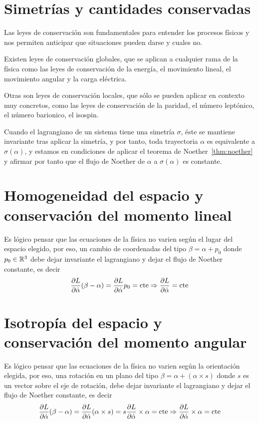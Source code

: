 \section{Simetrías y cantidades conservadas}

Las leyes de conservación son fundamentales para entender los procesos físicos y nos permiten anticipar que situaciones pueden darse y cuales no.

Existen leyes de conservación globales, que se aplican a cualquier rama de la física como las leyes de conservación de la energía, el movimiento lineal, el movimiento angular y la carga eléctrica.

Otras son leyes de conservación locales, que sólo se pueden aplicar en contexto muy concretos, como las leyes de conservación de la paridad, el número leptónico, el número barionico, el isospin.

Cuando el lagrangiano de un sistema tiene una simetría $\sigma$, éste se mantiene invariante tras aplicar la simetría, y por tanto, toda trayectoria $\alpha$ es equivalente a $\sigma(\alpha)$, y estamos en condiciones de aplicar el teorema de Noether~\eqref{thm:noether} y afirmar por tanto que el flujo de Noether de $\alpha$ a $\sigma(\alpha)$ es constante.

\section{Homogeneidad del espacio y conservación del momento lineal}
Es lógico pensar que las ecuaciones de la física no varien según el lugar del espacio elegido, por eso, un cambio de coordenadas del tipo $\beta=\alpha+p_0$ donde $p_0\in\mathbb{R}^3$ debe dejar invariante el lagrangiano y dejar el flujo de Noether constante, es decir
\begin{equation}
	\label{eq:conservacion_momento_lineal}
	\frac{\partial L}{\partial\dot{\alpha}}(\beta-\alpha) = \frac{\partial L}{\partial\dot{\alpha}}p_0=\text{cte}\Rightarrow\frac{\partial L}{\partial\dot{\alpha}}=\text{cte}
\end{equation}

\section{Isotropía del espacio y conservación del momento angular}
Es lógico pensar que las ecuaciones de la física no varien según la orientación elegida, por eso, una rotación en un plano del tipo $\beta=\alpha + (\alpha\times s)$ donde $s$ es un vector sobre el eje de rotación, debe dejar invariante el lagrangiano y dejar el flujo de Noether constante, es decir
\begin{equation}
	\label{eq:conservacion_momento_angular}
	\frac{\partial L}{\partial\dot{\alpha}}(\beta-\alpha) = \frac{\partial L}{\partial\dot{\alpha}}(\alpha\times s) = s \frac{\partial L}{\partial\dot{\alpha}}\times \alpha=\text{cte}\Rightarrow\frac{\partial L}{\partial\dot{\alpha}}\times \alpha=\text{cte}
\end{equation}

